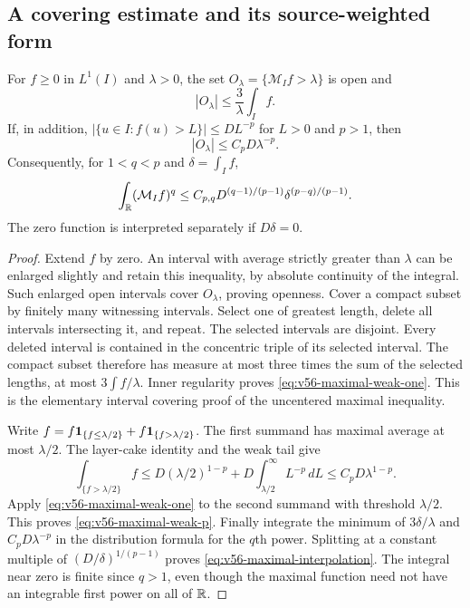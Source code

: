 \subsection{A covering estimate and its source-weighted form}
\begin{lemma}
\label{lem:v56-covering}
For $f\ge0$ in $L^1(I)$ and $\lambda>0$, the set
$O_\lambda=\{\mathcal M_I f>\lambda\}$ is open and
\begin{equation}\label{eq:v56-maximal-weak-one}
 |O_\lambda|\le\frac3\lambda\int_I f.
\end{equation}
If, in addition, $|\{u\in I:f(u)>L\}|\le D L^{-p}$ for
$L>0$ and $p>1$, then
\begin{equation}\label{eq:v56-maximal-weak-p}
 |O_\lambda|\le C_pD\lambda^{-p}.
\end{equation}
Consequently, for $1<q<p$ and $\delta=\int_I f$,
\begin{equation}\label{eq:v56-maximal-interpolation}
 \int_{\R}(\mathcal M_I f)^q
       \le C_{p,q}D^{(q-1)/(p-1)}
                          \delta^{(p-q)/(p-1)}.
\end{equation}
The zero function is interpreted separately if $D\delta=0$.
\end{lemma}
\begin{proof}
Extend $f$ by zero. An interval with average strictly greater than
$\lambda$ can be enlarged slightly and retain this inequality, by
absolute continuity of the integral. Such enlarged open intervals
cover $O_\lambda$, proving openness. Cover a compact subset by
finitely many witnessing intervals. Select one of greatest length,
delete all intervals intersecting it, and repeat. The selected
intervals are disjoint. Every deleted interval is contained in the
concentric triple of its selected interval. The compact subset
therefore has measure at most three times the sum of the selected
lengths, at most $3\int f/\lambda$. Inner regularity proves
\eqref{eq:v56-maximal-weak-one}. This is the elementary interval
covering proof of the uncentered maximal inequality.

Write $f=f\mathbf1_{\{f\le\lambda/2\}}+
 f\mathbf1_{\{f>\lambda/2\}}$. The first summand has maximal average
at most $\lambda/2$. The layer-cake identity and the weak tail give
\[
 \int_{\{f>\lambda/2\}}f
 \le D(\lambda/2)^{1-p}
       +D\int_{\lambda/2}^{\infty}L^{-p}\,dL
 \le C_pD\lambda^{1-p}.
\]
Apply \eqref{eq:v56-maximal-weak-one} to the second summand with
threshold $\lambda/2$. This proves \eqref{eq:v56-maximal-weak-p}.
Finally integrate the minimum of $3\delta/\lambda$ and
$C_pD\lambda^{-p}$ in the distribution formula for the $q$th
power. Splitting at a constant multiple of
$(D/\delta)^{1/(p-1)}$ proves
\eqref{eq:v56-maximal-interpolation}. The integral near zero is
finite since $q>1$, even though the maximal function need not have
an integrable first power on all of $\mathbb R$.
\end{proof}

